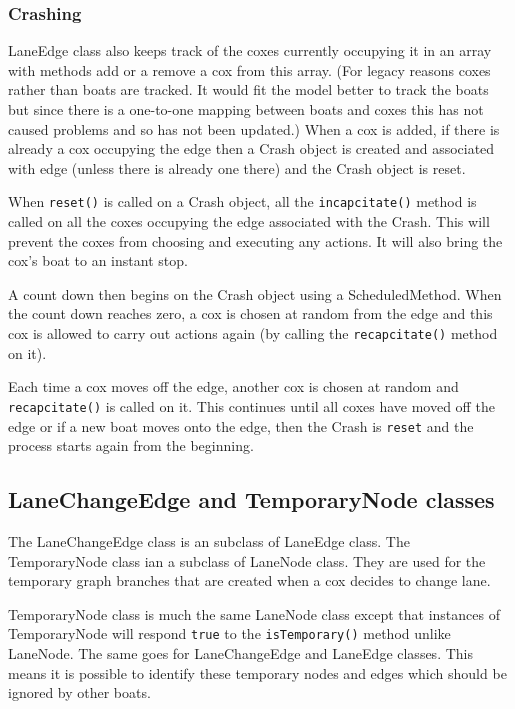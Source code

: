 \subsubsection{Crashing}

LaneEdge class also keeps track of the coxes currently occupying it
in an array with methods add or a remove a cox from this array. (For
legacy reasons coxes rather than boats are tracked. It would fit the
model better to track the boats but since there is a one-to-one
mapping between boats and coxes this has not caused problems and so
has not been updated.) When a
cox is added, if there is already a cox occupying the edge then a
Crash object is created and associated with edge (unless there is
already one there) and the Crash object is reset.

When \texttt{reset()} is called on a Crash object, all the
\texttt{incapcitate()} method is called on all the coxes
occupying the edge associated with the Crash. This will prevent the
coxes from choosing and executing any actions. It will also bring the
cox's boat to an instant stop.

A count down then begins on the Crash object using a
ScheduledMethod. When the count down reaches zero, a cox is chosen at
random from the edge and this cox is allowed to carry out actions
again (by calling the \texttt{recapcitate()} method on it).

Each time a cox moves off the edge, another cox is chosen at
random and \texttt{recapcitate()} is called on it. This continues
until all coxes have moved off the edge or if a new boat moves onto
the edge, then the Crash is \texttt{reset} and the process starts
again from the beginning.

\subsection{LaneChangeEdge and TemporaryNode classes}\label{software:lane:lanechange}

The LaneChangeEdge class is an subclass of LaneEdge class. The
TemporaryNode class ian a subclass of LaneNode class. They are used
for the temporary graph branches that are created when a cox decides
to change lane.

TemporaryNode class is much the same LaneNode class except that
instances of TemporaryNode will respond \texttt{true} to the
\texttt{isTemporary()} method unlike
LaneNode. The same goes for LaneChangeEdge and LaneEdge classes. This
means it is possible to identify these temporary nodes and edges which
should be ignored by other boats.

